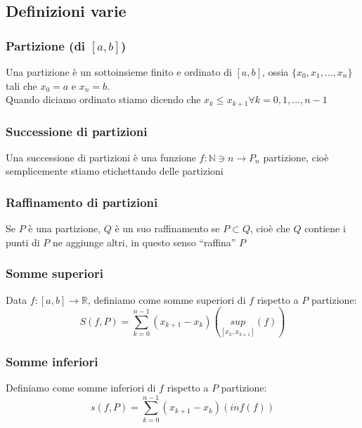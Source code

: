 \documentclass{article}
\theoremstyle{definition}
\newcommand{\R}{\mathbb{R}}
\newcommand{\N}{\mathbb{N}}
\newcommand{\virgolette}[1]{``#1''}
\begin{document}
\subsection{Definizioni varie}
\subsubsection{Partizione (di $[a,b]$)}
Una partizione è un sottoinsieme finito e ordinato di $[a,b]$, ossia $\{x_0,x_1,...,x_n\}$ tali che $x_0=a$ e $x_n=b$.
\\
Quando diciamo ordinato stiamo dicendo che $x_k \leqslant x_{k+1} \forall k=0,1,...,n-1$
\subsubsection{Successione di partizioni}
Una successione di partizioni è una funzione $f: \N \owns n \to P_n$ partizione, cioè semplicemente stiamo etichettando delle partizioni
\subsubsection{Raffinamento di partizioni}
Se $P$ è una partizione, $Q$ è un suo raffinamento se $P \subset Q$, cioè che $Q$ contiene i punti di $P$  ne aggiunge altri, in questo senso \virgolette{raffina} $P$
\subsubsection{Somme superiori}
Data $f: [a,b] \to \R$, definiamo come somme superiori di $f$ rispetto a $P$ partizione:
\begin{equation*}
    S(f,P)=\sum_{k=0}^{n-1}(x_{k+1}-x_k)(\underset{[x_k,x_{k+1}]}{sup}(f))
\end{equation*}
\subsubsection{Somme inferiori}
Definiamo come somme inferiori di $f$ rispetto a $P$ partizione:
\begin{equation*}
    s(f,P)=\sum_{k=0}^{n-1}(x_{k+1}-x_k)(inf(f))
\end{equation*}
\end{document}
